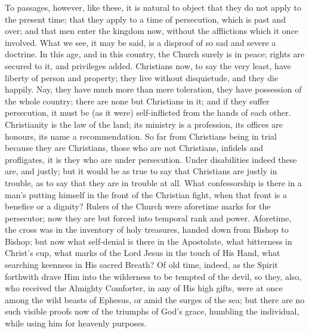 To passages, however, like these, it is natural to object that they
do not apply to the present time; that they apply to a time of
persecution, which is past and over; and that men enter the kingdom
now, without the afflictions which it once involved. What we see, it
may be said, is a disproof of so sad and severe a doctrine. In this
age, and in this country, the Church surely is in peace; rights are
secured to it, and privileges added. Christians now, to say the very
least, have liberty of person and property; they live without
disquietude, and they die happily. Nay, they have much more than mere
toleration, they have possession of the whole country; there are none
but Christians in it; and if they suffer persecution, it must be (as
it were) self-inflicted from the hands of each other. Christianity is
the law of the land; its ministry is a profession, its offices are
honours, its name a recommendation. So far from Christians being in
trial because they are Christians, those who are not Christians,
infidels and profligates, it is they who are under persecution. Under
disabilities indeed these are, and justly; but it would be as true to
say that Christians are justly in trouble, as to say that they are in
trouble at all. What confessorship is there in a man's putting himself
in the front of the Christian fight, when that front is a benefice or
a dignity? Rulers of the Church were aforetime marks for the
persecutor; now they are but forced into temporal rank and power.
Aforetime, the cross was in the inventory of holy treasures, handed
down from Bishop to Bishop; but now what self-denial is there in the
Apostolate, what bitterness in Christ's cup, what marks of the Lord
Jesus in the touch of His Hand, what searching keenness in His sacred
Breath? Of old time, indeed, as the Spirit forthwith drave Him into
the wilderness to be tempted of the devil, so they, also, who received
the Almighty Comforter, in any of His high gifts, were at once among
the wild beasts of Ephesus, or amid the surges of the sea; but there
are no such visible proofs now of the triumphs of God's grace,
humbling the individual, while using him for heavenly purposes.

